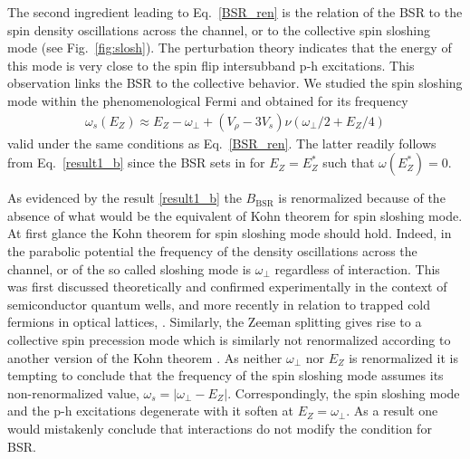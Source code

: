 The second ingredient leading to Eq.~\eqref{BSR_ren} is the relation of the BSR to the spin density oscillations across the channel, or to the collective spin sloshing mode (see Fig.~\ref{fig:slosh}).
The perturbation theory indicates that the energy of this mode is very close to the spin flip intersubband  p-h excitations.
This observation links the BSR to the collective behavior.
We studied the spin sloshing mode within the phenomenological Fermi and obtained for its frequency
\begin{align}\label{result1_b}
\omega_{s}(E_Z) \approx 
E_Z  - \omega_{\perp} +(V_{\rho} \! -\!  3 V_s)\nu
(\omega_{\perp}/2 + E_Z/4)
\end{align}
valid under the same conditions as Eq.~\eqref{BSR_ren}.
The latter readily follows from Eq.~\eqref{result1_b} since the BSR sets in for $E_Z = E_Z^*$ such that $\omega(E_Z^*)  = 0$.

As evidenced by the result \eqref{result1_b} the $B_{\mathrm{BSR}}$ is  renormalized because of the absence of what would be the equivalent of Kohn theorem \cite{Kohn1961} for spin sloshing mode.
At first glance the Kohn theorem for spin sloshing mode should hold.
Indeed, in the parabolic potential the frequency of the density oscillations across the channel, or of the so called sloshing mode is $\omega_{\perp}$ regardless of interaction.
This was first discussed theoretically  \cite{Dobson1994,Brey1989} and confirmed experimentally \cite{Wixforth1994} in the context of semiconductor quantum wells, and more recently in relation to trapped cold fermions in optical lattices, \cite{Minguzzi2001,Chiacchiera2009}. 
Similarly, the Zeeman splitting gives rise to a collective spin precession mode which is similarly not renormalized according to another version of the Kohn theorem \cite{Yafet1963}.
As neither $\omega_{\perp}$ nor $E_Z$ is renormalized it is tempting to conclude that the frequency of the spin sloshing mode assumes its
non-renormalized value, $\omega_s = | \omega_{\perp} - E_Z|$.
Correspondingly, the spin sloshing mode and the p-h excitations degenerate with it soften at $E_Z = \omega_{\perp}$.
As a result one would mistakenly conclude that interactions do not modify the condition for BSR. 


